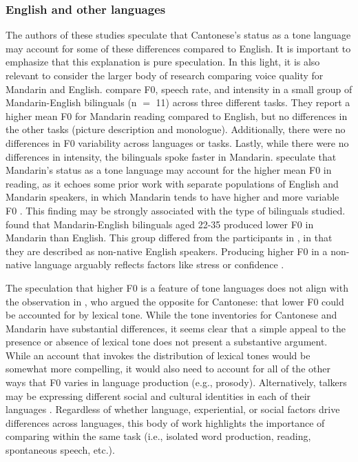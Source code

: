 \subsubsection{English and other languages}

The authors of these studies speculate that Cantonese's status as a tone language may account for some of these differences compared to English. It is important to emphasize that this explanation is pure speculation. In this light, it is also relevant to consider the larger body of research comparing voice quality for Mandarin and English. \citet{lee_2017_bilingual} compare F0, speech rate, and intensity in a small group of Mandarin-English bilinguals (n $=$ 11) across three different tasks. They report a higher mean F0 for Mandarin reading compared to English, but no differences in the other tasks (picture description and monologue). Additionally, there were no differences in F0 variability across languages or tasks. Lastly, while there were no differences in intensity, the bilinguals spoke faster in Mandarin. \citet{lee_2017_bilingual} speculate that Mandarin's status as a tone language may account for the higher mean F0 in reading, as it echoes some prior work with separate populations of English and Mandarin speakers, in which Mandarin tends to have higher and more variable F0 \citep{keating_2012_f0}. This finding may be strongly associated with the type of bilinguals studied. \citet{xue_2002_f0} found that Mandarin-English bilinguals aged 22-35 produced lower F0 in Mandarin than English. This group differed from the participants in \citet{lee_2017_bilingual}, in that they are described as non-native English speakers. Producing higher F0 in a non-native language arguably reflects factors like stress or confidence \citep{jarvinen_2013_speaking, lee_2017_bilingual}.

The speculation that higher F0 is a feature of tone languages does not align with the observation in \citet{ng_2012_ltas}, who argued the opposite for Cantonese: that lower F0 could be accounted for by lexical tone. While the tone inventories for Cantonese and Mandarin have substantial differences, it seems clear that a simple appeal to the presence or absence of lexical tone does not present a substantive argument. While an account that invokes the distribution of lexical tones would be somewhat more compelling, it would also need to account for all of the other ways that F0 varies in language production (e.g., prosody). Alternatively, talkers may be expressing different social and cultural identities in each of their languages \citep{loveday_1981_pitch, voigt_2016_between}. Regardless of whether language, experiential, or social factors drive differences across languages, this body of work highlights the importance of comparing within the same task (i.e., isolated word production, reading, spontaneous speech, etc.). 

